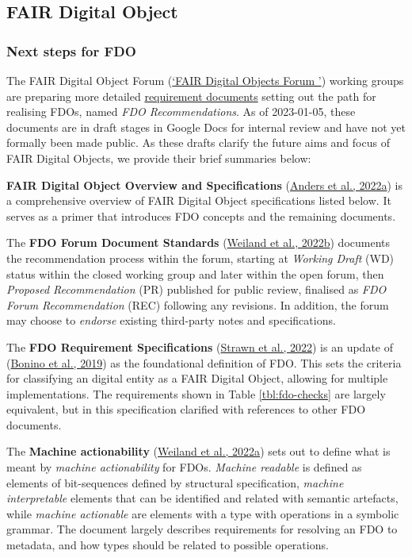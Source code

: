\hypertarget{sec:fdo}{%
\subsection{FAIR Digital Object}\label{sec:fdo}}

\hypertarget{sec:next-step-fdo}{%
\subsubsection{Next steps for FDO}\label{sec:next-step-fdo}}

The FAIR Digital Object Forum (\protect\hyperlink{ref-DMEBhHID}{{`FAIR Digital Objects Forum \textbar{}'}}) working groups are preparing more detailed \href{https://docs.google.com/spreadsheets/d/1O1PTLmVWqjQgvJsIcPgaZJe9BntHZt8_QndEG0eRwUY/edit}{requirement documents} setting out the path for realising FDOs, named \emph{FDO Recommendations}. As of 2023-01-05, these documents are in draft stages in Google Docs for internal review and have not yet formally been made public. As these drafts clarify the future aims and focus of FAIR Digital Objects, we provide their brief summaries below:

\textbf{FAIR Digital Object Overview and Specifications} (\protect\hyperlink{ref-11NpETLq1}{Anders et al., 2022a}) is a comprehensive overview of FAIR Digital Object specifications listed below. It serves as a primer that introduces FDO concepts and the remaining documents.

The \textbf{FDO Forum Document Standards} (\protect\hyperlink{ref-TQdku4YF}{Weiland et al., 2022b}) documents the recommendation process within the forum, starting at \emph{Working Draft} (WD) status within the closed working group and later within the open forum, then \emph{Proposed Recommendation} (PR) published for public review, finalised as \emph{FDO Forum Recommendation} (REC) following any revisions. In addition, the forum may choose to \emph{endorse} existing third-party notes and specifications.

The \textbf{FDO Requirement Specifications} (\protect\hyperlink{ref-yygVPoL0}{Strawn et al., 2022}) is an update of (\protect\hyperlink{ref-RwvirqWg}{Bonino et al., 2019}) as the foundational definition of FDO. This sets the criteria for classifying an digital entity as a FAIR Digital Object, allowing for multiple implementations. The requirements shown in Table \ref{tbl:fdo-checks} are largely equivalent, but in this specification clarified with references to other FDO documents.

The \textbf{Machine actionability} (\protect\hyperlink{ref-iJeys0T5}{Weiland et al., 2022a}) sets out to define what is meant by \emph{machine actionability} for FDOs. \emph{Machine readable} is defined as elements of bit-sequences defined by structural specification, \emph{machine interpretable} elements that can be identified and related with semantic artefacts, while \emph{machine actionable} are elements with a type with operations in a symbolic grammar. The document largely describes requirements for resolving an FDO to metadata, and how types should be related to possible operations.

